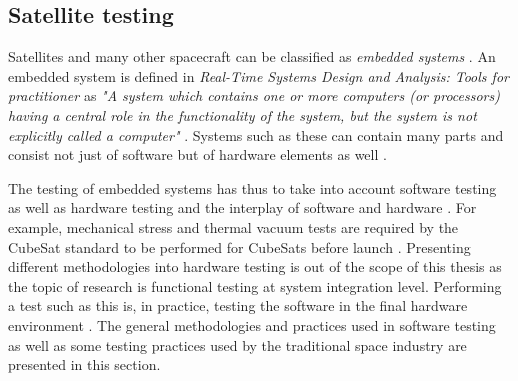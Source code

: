 \documentclass[english,12pt,a4paper,pdftex,elec,utf8]{aaltothesis}
\begin{document}
\subsection{Satellite testing}
Satellites and many other spacecraft can be classified as \textit{embedded systems} \cite{embeddedjokusatellite}. An embedded system is defined in \textit{Real-Time Systems Design and Analysis: Tools for practitioner} as \textit{"A system which contains one or more computers (or processors) having a central role in the functionality of the system, but the system is not explicitly called a computer"} \cite{sularikurssi}. Systems such as these can contain  many parts and consist not just of software but of hardware elements as well \cite{embeddedsofteng}.\par
The testing of embedded systems has thus to take into account software testing as well as hardware testing and the interplay of software and hardware \cite{embeddedsofteng}. For example, mechanical stress and thermal vacuum tests are required by the CubeSat standard to be performed for CubeSats before launch \cite{cds}. Presenting different methodologies into hardware testing is out of the scope of this thesis as the topic of research is functional testing at system integration level. Performing a test such as this is, in practice, testing the software in the final hardware environment \cite{embeddedsofteng}. The general methodologies and practices used in software testing as well as some testing practices used by the traditional space industry are presented in this section.\par   
\end{document}
